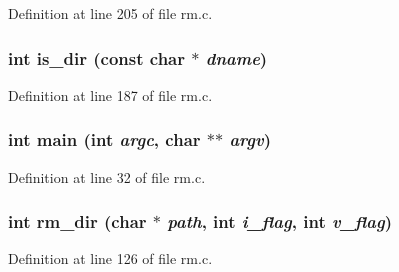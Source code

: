 Definition at line 205 of file rm.c.

\subsubsection[{is\_\-dir}]{\setlength{\rightskip}{0pt plus 5cm}int is\_\-dir (const char $\ast$ {\em dname})}\label{rm_8c_a7791f3db8a56d9f73ddbd1a774023873}


Definition at line 187 of file rm.c.

\subsubsection[{main}]{\setlength{\rightskip}{0pt plus 5cm}int main (int {\em argc}, \/  char $\ast$$\ast$ {\em argv})}\label{rm_8c_a3c04138a5bfe5d72780bb7e82a18e627}


Definition at line 32 of file rm.c.

\subsubsection[{rm\_\-dir}]{\setlength{\rightskip}{0pt plus 5cm}int rm\_\-dir (char $\ast$ {\em path}, \/  int {\em i\_\-flag}, \/  int {\em v\_\-flag})}\label{rm_8c_a021d2adf79158fda37d6da17998b89fe}


Definition at line 126 of file rm.c.

